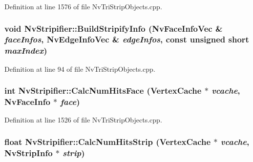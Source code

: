 Definition at line 1576 of file NvTriStripObjects.cpp.\hypertarget{class_nv_stripifier_1412a60d8d339102fb3514fdb01480cd}{
\subsubsection[{BuildStripifyInfo}]{\setlength{\rightskip}{0pt plus 5cm}void NvStripifier::BuildStripifyInfo ({\bf NvFaceInfoVec} \& {\em faceInfos}, \/  {\bf NvEdgeInfoVec} \& {\em edgeInfos}, \/  const unsigned short {\em maxIndex})}}
\label{class_nv_stripifier_1412a60d8d339102fb3514fdb01480cd}




Definition at line 94 of file NvTriStripObjects.cpp.\hypertarget{class_nv_stripifier_351bf050700631c934ce6129cb0912ea}{
\subsubsection[{CalcNumHitsFace}]{\setlength{\rightskip}{0pt plus 5cm}int NvStripifier::CalcNumHitsFace ({\bf VertexCache} $\ast$ {\em vcache}, \/  {\bf NvFaceInfo} $\ast$ {\em face})}}
\label{class_nv_stripifier_351bf050700631c934ce6129cb0912ea}




Definition at line 1526 of file NvTriStripObjects.cpp.\hypertarget{class_nv_stripifier_e34f56d66a8a81e65f29a44a8f7ba285}{
\subsubsection[{CalcNumHitsStrip}]{\setlength{\rightskip}{0pt plus 5cm}float NvStripifier::CalcNumHitsStrip ({\bf VertexCache} $\ast$ {\em vcache}, \/  {\bf NvStripInfo} $\ast$ {\em strip})}}
\label{class_nv_stripifier_e34f56d66a8a81e65f29a44a8f7ba285}




